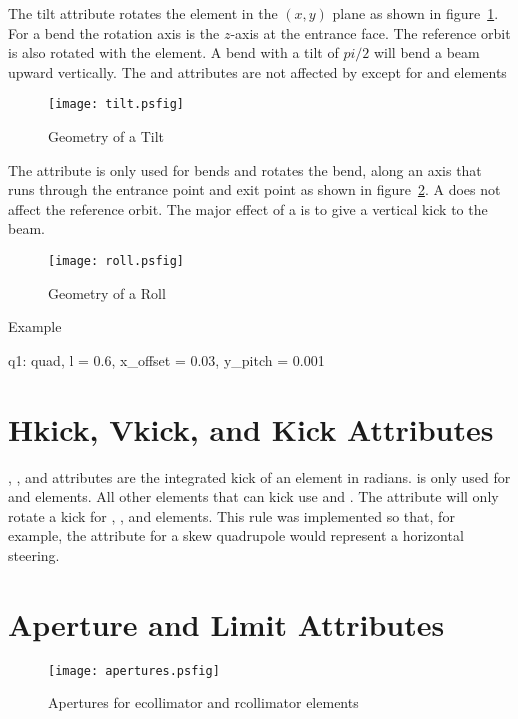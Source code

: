 The tilt attribute rotates the element in the $(x, y)$ plane as
shown in figure~\ref{f:tilt}. For a bend the rotation axis is the
$z$-axis at the entrance face. The reference orbit is also rotated
with the element. A bend with a tilt of $pi/2$ will bend a beam
upward vertically. The  and  attributes are
not affected by  except for  and 
elements
\begin{figure}
  \centering
  \texttt{[image: tilt.psfig]}
  \caption{Geometry of a Tilt}
  \label{f:tilt}
\end{figure}


The  attribute is only used for bends
and rotates the bend, along an axis that runs through the entrance
point and exit point as shown in figure~\ref{f:roll}. A  
does not affect the reference orbit. The major effect of a 
is to give a vertical kick to the beam.
\begin{figure}
  \centering
  \texttt{[image: roll.psfig]}
  \caption{Geometry of a Roll}
  \label{f:roll}
\end{figure}

\noindent
Example
\begin{example}
  q1: quad, l = 0.6, x_offset = 0.03, y_pitch = 0.001
\end{example}

\section{Hkick, Vkick, and Kick Attributes}
\label{s:kick}

, , and  attributes are the integrated
kick of an element in radians.  is only used for 
and  elements. All other elements that can kick use 
 and . The  attribute will only rotate
a kick for , ,  and 
elements. This rule was implemented so that, for example, the 
 attribute for a skew quadrupole
would represent a horizontal steering.

\section{Aperture and Limit Attributes}
\label{s:limit}

\begin{figure}
  \centering
  \texttt{[image: apertures.psfig]}
  \caption{Apertures for ecollimator and rcollimator elements}
  \label{f:limit}
\end{figure}

